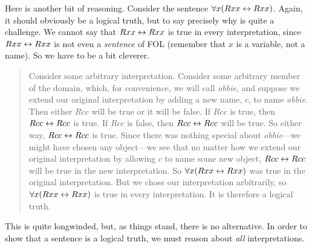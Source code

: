 Here is another bit of reasoning. Consider the sentence $\forall x(Rxx\leftrightarrow Rxx)$. Again, it should obviously be a logical truth, but to say precisely why is quite a challenge. We cannot say that $Rxx \leftrightarrow Rxx$ is true in every interpretation, since $Rxx \leftrightarrow Rxx$ is not even a \emph{sentence} of FOL (remember that $x$ is a variable, not a name). So we have to be a bit cleverer. 
	\begin{quote}
		Consider some arbitrary interpretation. Consider some arbitrary member of the domain, which, for convenience, we will call \emph{obbie}, and suppose we extend our original interpretation by adding a new name, $c$, to name \emph{obbie}. Then either $Rcc$ will be true or it will be false. If $Rcc$ is true, then $Rcc \leftrightarrow Rcc$ is true. If $Rcc$ is false, then $Rcc \leftrightarrow Rcc$ will be true. So either way, $Rcc \leftrightarrow Rcc$ is true. Since there was nothing special about \emph{obbie}---we might have chosen any object---we see that no matter how we extend our original interpretation by allowing $c$ to name some new object, $Rcc \leftrightarrow Rcc$ will be true in the new interpretation. So $\forall x (Rxx \leftrightarrow Rxx)$ was true in the original interpretation. But we chose our interpretation arbitrarily, so $\forall x (Rxx \leftrightarrow Rxx)$ is true in every interpretation. It is therefore a logical truth.
	\end{quote}
This is quite longwinded, but, as things stand, there is no alternative. In order to show that a sentence is a logical truth, we must reason about \emph{all} interpretations. 

